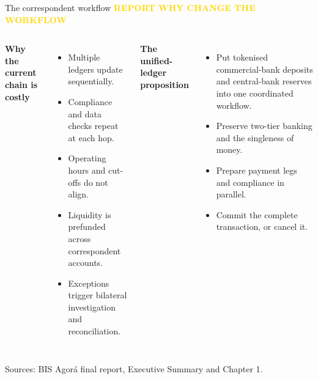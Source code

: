 \documentclass[aspectratio=169,12pt]{beamer}
\newcommand{\rust}[1]{\textcolor{Rust}{\textbf{#1}}}
\newcommand{\blue}[1]{\textcolor{Ocean}{\textbf{#1}}}
\newcommand{\source}[1]{\vfill\par\fontsize{5.4}{6.5}\selectfont\color{Quiet}Sources: #1}
\newcommand{\verytightitems}{\setlength{\itemsep}{0.22em}\setlength{\parskip}{0pt}}
\newcommand{\reporttag}[1]{\textcolor{Gold}{\fontsize{7.2}{8.5}\selectfont\bfseries REPORT #1}}
\begin{document}
\begin{frame}[shrink=30]{The correspondent workflow}
  \reporttag{WHY CHANGE THE WORKFLOW}\par\vspace{0.12cm}
  \begin{columns}[T,onlytextwidth]
      \rust{Why the current chain is costly}
      \begin{itemize}\verytightitems
        \item Multiple ledgers update sequentially.
        \item Compliance and data checks repeat at each hop.
        \item Operating hours and cut-offs do not align.
        \item Liquidity is prefunded across correspondent accounts.
        \item Exceptions trigger bilateral investigation and reconciliation.
      \end{itemize}
      \blue{The unified-ledger proposition}
      \begin{itemize}\verytightitems
        \item Put tokenised commercial-bank deposits and central-bank reserves into one coordinated workflow.
        \item Preserve two-tier banking and the singleness of money.
        \item Prepare payment legs and compliance in parallel.
        \item Commit the complete transaction, or cancel it.
      \end{itemize}
  \end{columns}
  \source{BIS Agor\'a final report, Executive Summary and Chapter 1.}
\end{frame}
\end{document}
